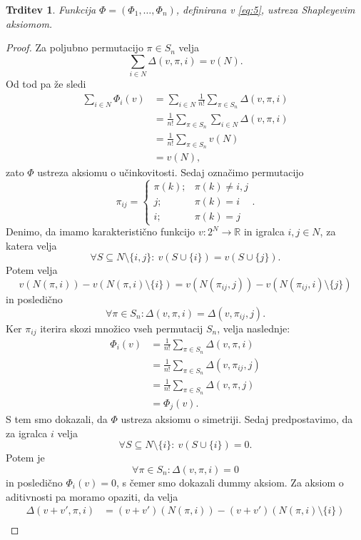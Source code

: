 \documentclass[10pt, a4paper]{article}
\newtheorem{trditev}[izr]{Trditev}
\newenvironment{noticeC}{%
  \tcolorbox[%
  notitle,
  empty,
  enhanced,  %
  breakable,
  coltext=black, 
  fontupper=\rmfamily,
  parbox=false,
  noparskip,
  sharp corners,
  boxrule=-1pt,  %
  frame hidden,
  left=7pt,  %
  right=7pt,
  top=5pt,
  bottom=5pt,
  before skip=2.5ex plus 2pt,
  after skip=2.5ex plus 2pt,
  overlay unbroken and last={%
  },
  ]}
{\endtcolorbox}
\newenvironment{dokaz}%
  {\begin{noticeC}\begin{proof}}%
  {\end{proof}\end{noticeC}}
\newcommand{\R}{\mathbb {R}}
\begin{document}
\begin{trditev}
  Funkcija $\Phi = (\Phi_1, \dots, \Phi_n)$, definirana v \eqref{eq:5}, ustreza Shapleyevim aksiomom.
\end{trditev}

\begin{dokaz}
  Za poljubno permutacijo $\pi \in S_n$ velja 
  $$\sum_{i \in N} \Delta(v, \pi, i) = v(N).$$
  Od tod pa že sledi 
  \begin{align*}
    \sum_{i \in N} \Phi_i (v) &= \sum_{i \in N} \frac{1}{n!} \sum_{\pi \in S_n} \Delta (v, \pi, i)\\
    &= \frac{1}{n!} \sum_{\pi \in S_n} \sum_{i \in N} \Delta (v, \pi, i)\\
    &= \frac{1}{n!} \sum_{\pi \in S_n} v(N)\\
    &= v(N),
  \end{align*}
  zato $\Phi$ ustreza aksiomu o učinkovitosti.
  Sedaj označimo permutacijo $$\pi_{ij} = \begin{cases}
    \pi(k);& \pi(k) \neq i, j\\
    j;& \pi(k) = i\\
    i;& \pi(k) = j
  \end{cases}.$$
  Denimo, da imamo karakteristično funkcijo $v: 2^N \to \R$
  in igralca $i, j \in N$, za katera velja 
  $$\forall S \subseteq N \setminus \{i, j\}:\ v(S \cup \{i\}) = v(S \cup \{j\}).$$
  Potem velja 
  $$v(N(\pi, i)) - v(N(\pi, i) \setminus \{i\}) = v(N(\pi_{ij}, j)) - v(N(\pi_{ij}, i) \setminus \{j\})$$
  in posledično
  $$\forall \pi \in S_n: \Delta(v, \pi, i) = \Delta(v, \pi_{ij}, j).$$
  Ker $\pi_{ij}$ iterira skozi množico vseh permutacij $S_n$, velja naslednje:
  \begin{align*}
    \Phi_i (v) &= \frac{1}{n!} \sum_{\pi \in S_n} \Delta(v, \pi, i)\\
    &= \frac{1}{n!} \sum_{\pi \in S_n} \Delta (v, \pi_{ij}, j)\\
    &= \frac{1}{n!} \sum_{\pi \in S_n} \Delta (v, \pi, j)\\
    &= \Phi_j (v).
  \end{align*}
  S tem smo dokazali, da $\Phi$ ustreza aksiomu o simetriji.
  Sedaj predpostavimo, da za igralca $i$ velja 
  $$\forall S \subseteq N \setminus \{i\}:\ v(S \cup \{i\}) = 0.$$
  Potem je 
  $$\forall \pi \in S_n: \Delta(v, \pi, i) = 0$$ in posledično $\Phi_i (v) = 0$,
  s čemer smo dokazali dummy aksiom.
  Za aksiom o aditivnosti pa moramo opaziti, da velja 
  \begin{align*}
    \Delta(v + v', \pi, i) &= (v + v') (N(\pi, i)) - (v + v')(N(\pi, i) \setminus \{i\})\\

\end{align*}
\end{dokaz}
\end{document}
